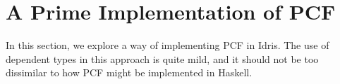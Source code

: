 \section{A Prime Implementation of PCF}

In this section, we explore a way of implementing PCF in Idris. 
The use of dependent types in this approach is quite mild, and it should not be too dissimilar to how PCF might be implemented in Haskell.










